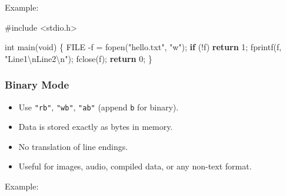 \documentclass[
  letterpaper,
  DIV=11,
  numbers=noendperiod]{scrreprt}
\newenvironment{Shaded}{\begin{snugshade}}{\end{snugshade}}
\newcommand{\ControlFlowTok}[1]{\textcolor[rgb]{0.00,0.23,0.31}{\textbf{#1}}}
\newcommand{\DataTypeTok}[1]{\textcolor[rgb]{0.68,0.00,0.00}{#1}}
\newcommand{\DecValTok}[1]{\textcolor[rgb]{0.68,0.00,0.00}{#1}}
\newcommand{\ImportTok}[1]{\textcolor[rgb]{0.00,0.46,0.62}{#1}}
\newcommand{\NormalTok}[1]{\textcolor[rgb]{0.00,0.23,0.31}{#1}}
\newcommand{\OperatorTok}[1]{\textcolor[rgb]{0.37,0.37,0.37}{#1}}
\newcommand{\PreprocessorTok}[1]{\textcolor[rgb]{0.68,0.00,0.00}{#1}}
\newcommand{\SpecialCharTok}[1]{\textcolor[rgb]{0.37,0.37,0.37}{#1}}
\newcommand{\StringTok}[1]{\textcolor[rgb]{0.13,0.47,0.30}{#1}}
\providecommand{\tightlist}{%
  \setlength{\itemsep}{0pt}\setlength{\parskip}{0pt}}
\begin{document}
Example:

\begin{Shaded}
\begin{Highlighting}[]
\PreprocessorTok{\#include }\ImportTok{\textless{}stdio.h\textgreater{}}

\DataTypeTok{int}\NormalTok{ main}\OperatorTok{(}\DataTypeTok{void}\OperatorTok{)} \OperatorTok{\{}
    \DataTypeTok{FILE} \OperatorTok{{-}}\NormalTok{f }\OperatorTok{=}\NormalTok{ fopen}\OperatorTok{(}\StringTok{"hello.txt"}\OperatorTok{,} \StringTok{"w"}\OperatorTok{);}
    \ControlFlowTok{if} \OperatorTok{(!}\NormalTok{f}\OperatorTok{)} \ControlFlowTok{return} \DecValTok{1}\OperatorTok{;}
\NormalTok{    fprintf}\OperatorTok{(}\NormalTok{f}\OperatorTok{,} \StringTok{"Line1}\SpecialCharTok{\textbackslash{}n}\StringTok{Line2}\SpecialCharTok{\textbackslash{}n}\StringTok{"}\OperatorTok{);}
\NormalTok{    fclose}\OperatorTok{(}\NormalTok{f}\OperatorTok{);}
    \ControlFlowTok{return} \DecValTok{0}\OperatorTok{;}
\OperatorTok{\}}
\end{Highlighting}
\end{Shaded}

\subsubsection{Binary Mode}\label{binary-mode}

\begin{itemize}
\tightlist
\item
  Use \texttt{"rb"}, \texttt{"wb"}, \texttt{"ab"} (append \texttt{b} for
  binary).
\item
  Data is stored exactly as bytes in memory.
\item
  No translation of line endings.
\item
  Useful for images, audio, compiled data, or any non-text format.
\end{itemize}

Example:
\end{document}
